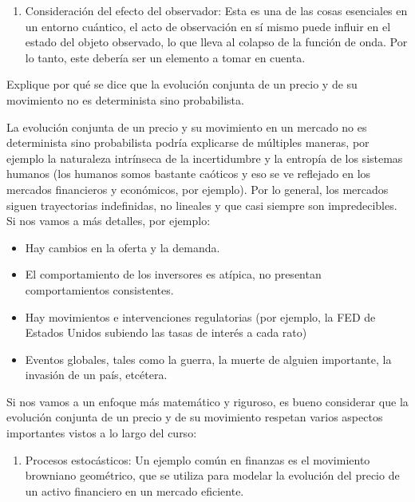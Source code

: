 \begin{problema}
\begin{sol}
\begin{enumerate}
            \item Consideración del efecto del observador: Esta es una de las cosas esenciales en un entorno cuántico, el acto de observación en sí mismo puede influir en el estado del objeto observado, lo que lleva al colapso de la función de onda. Por lo tanto, este debería ser un elemento a tomar en cuenta. 
        \end{enumerate}


    \end{sol}
\end{problema}


\begin{problema}
    Explique por qué se dice que la evolución conjunta de un precio y de su movimiento no es determinista sino probabilista.
    \begin{sol}
        La evolución conjunta de un precio y su movimiento en un mercado no es determinista sino probabilista podría explicarse de múltiples maneras, por ejemplo la naturaleza intrínseca de la incertidumbre y la entropía de los sistemas humanos (los humanos somos bastante caóticos y eso se ve reflejado en los mercados financieros y económicos, por ejemplo). Por lo general, los mercados siguen trayectorias indefinidas, no lineales y que casi siempre son impredecibles. Si nos vamos a más detalles, por ejemplo: 
        \begin{itemize}
            \item Hay cambios en la oferta y la demanda. 
            \item El comportamiento de los inversores es atípica, no presentan comportamientos consistentes. 
            \item Hay movimientos e intervenciones regulatorias (por ejemplo, la FED de Estados Unidos subiendo las tasas de interés a cada rato)
            \item Eventos globales, tales como la guerra, la muerte de alguien importante, la invasión de un país, etcétera. 
        \end{itemize}
        
        Si nos vamos a un enfoque más matemático y riguroso, es bueno considerar que la  evolución conjunta de un precio y de su movimiento respetan varios aspectos importantes vistos a lo largo del curso: 
\begin{enumerate}
    \item Procesos estocásticos: Un ejemplo común en finanzas es el movimiento browniano geométrico, que se utiliza para modelar la evolución del precio de un activo financiero en un mercado eficiente.
    

\end{enumerate}
\end{sol}
\end{problema}
